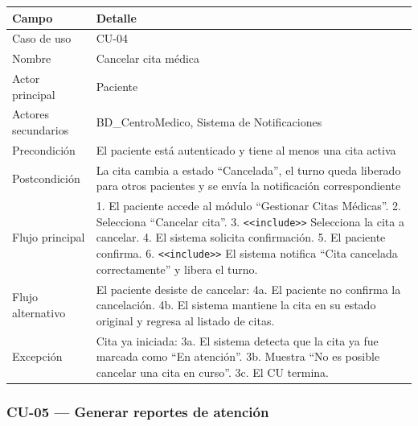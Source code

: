 \documentclass[11pt,a4paper]{article}
\begin{document}
	\begin{longtable}{p{} p{} }
		
		
		\toprule
		\textbf{Campo} &
		\textbf{Detalle}  \\
		\midrule
		\endhead
		
		Caso de uso & CU-04 \\
		Nombre & Cancelar cita médica \\
		Actor principal & Paciente \\
		Actores secundarios & BD\_CentroMedico, Sistema de Notificaciones \\
		Precondición & El paciente está autenticado y tiene al menos una cita activa \\
		Postcondición & La cita cambia a estado ``Cancelada'', el turno queda liberado para otros pacientes y se envía la notificación correspondiente \\
		Flujo principal & 1. El paciente accede al módulo ``Gestionar Citas Médicas''. 2. Selecciona ``Cancelar cita''. 3. \texttt{<<include>>} Selecciona la cita a cancelar. 4. El sistema solicita confirmación. 5. El paciente confirma. 6. \texttt{<<include>>} El sistema notifica ``Cita cancelada correctamente'' y libera el turno. \\
		Flujo alternativo & El paciente desiste de cancelar: 4a. El paciente no confirma la cancelación. 4b. El sistema mantiene la cita en su estado original y regresa al listado de citas. \\
		Excepción & Cita ya iniciada: 3a. El sistema detecta que la cita ya fue marcada como ``En atención''. 3b. Muestra ``No es posible cancelar una cita en curso''. 3c. El CU termina. \\
		
		\bottomrule
	\end{longtable}
	
	\subsubsection{CU-05 --- Generar reportes de atención}
	
\end{document}
